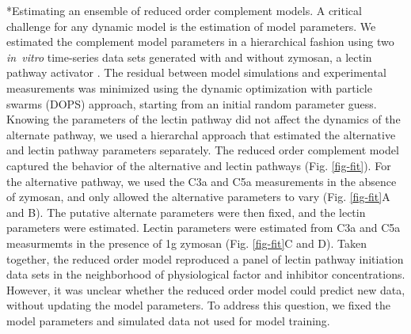 \documentclass[12pt]{article}
\makeatletter
\renewcommand\subsection{\@startsection
	{subsection}{2}{0mm}
	{-0.05in}
	{-0.5\baselineskip}
	{\normalfont\normalsize\bfseries}}
\makeatother
\begin{document}
\subsection*{Estimating an ensemble of reduced order complement models.}
A critical challenge for any dynamic model is the estimation of model parameters.
We estimated the complement model parameters in a hierarchical fashion using two \textit{in~vitro} time-series data sets generated with and without zymosan, a lectin pathway activator \cite{morad2015time}.
The residual between model simulations and experimental measurements was minimized using the dynamic optimization with particle swarms (DOPS) approach,
starting from an initial random parameter guess.
Knowing the parameters of the lectin pathway did not affect the dynamics of the alternate pathway,
we used a hierarchal approach that estimated the alternative and lectin pathway parameters separately.
The reduced order complement model captured the behavior of the alternative and lectin pathways (Fig. \ref{fig-fit}).
For the alternative pathway, we used the C3a and C5a measurements in the absence of zymosan, and only allowed the alternative parameters to vary (Fig. \ref{fig-fit}A and B).
The putative alternate parameters were then fixed, and the lectin parameters were estimated.
Lectin parameters were estimated from C3a and C5a measurmemts in the presence of 1g zymosan (Fig. \ref{fig-fit}C and D).
Taken together, the reduced order model reproduced a panel of lectin pathway initiation data sets in the neighborhood of physiological factor and inhibitor concentrations.
However, it was unclear whether the reduced order model could predict new data, without updating the model parameters.
To address this question, we fixed the model parameters and simulated data not used for model training.

\end{document}
